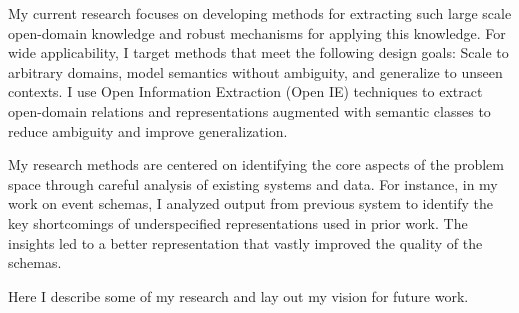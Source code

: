 \documentclass[a4paper,11pt,onecolumn]{article}
\newcommand{\eat}[1]{}
\begin{document}
My current research focuses on developing methods for extracting such large scale open-domain knowledge and robust mechanisms for applying this knowledge. For wide applicability, I target methods that meet the following design goals: Scale to arbitrary domains, model semantics without ambiguity, and generalize to unseen contexts. I use Open Information Extraction (Open IE) techniques to extract open-domain relations and representations augmented with semantic classes to reduce ambiguity and improve generalization.

My research methods are centered on identifying the core aspects of the problem space through careful analysis of existing systems and data. For instance, in my work on event schemas, I analyzed output from previous system to identify the key shortcomings of underspecified representations used in prior work. The insights led to a better representation that vastly improved the quality of the schemas. 




Here I describe some of my research and lay out my vision for future work.

\eat{My vision is to develop methods for extracting large scale open-domain knowledge. My research is motivated by applications such as event extraction and question answering, which require computer systems to extract, understand and reason with information present in natural language text. For example, event extraction systems use knowledge about events to guide extraction.}
\end{document}
